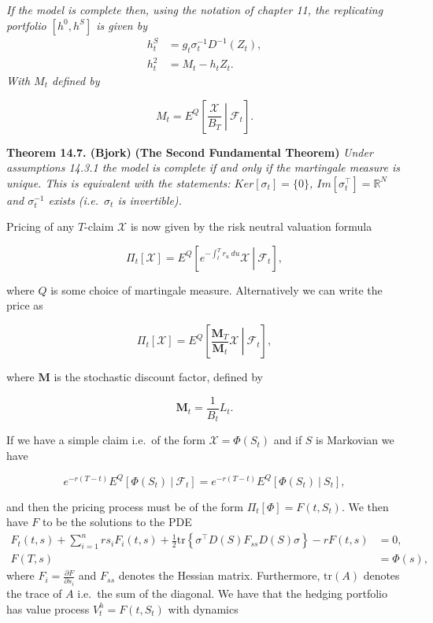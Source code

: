 \documentclass[a4paper,12pt,openany]{book}
\begin{document}
\emph{If the model is complete then, using the notation of chapter 11, the replicating portfolio \([h^0,h^S]\) is given by}
\begin{align*}
h_t^S&=g_t\sigma_t^{-1}D^{-1}(Z_t),\tag{14.24}\\
h_t^2&=M_t-h_tZ_t.\tag{14.25}
\end{align*}
\emph{With \(M_t\) defined by}

\[
M_t=E^Q\left[\left. \frac{\mathcal{X}}{B_T}\ \right\vert\ \mathcal{F}_t \right].\tag{14.17}
\]

\textbf{Theorem 14.7. (Bjork)} \textbf{(The Second Fundamental Theorem)} \emph{Under assumptions 14.3.1 the model is complete if and only if the martingale measure is unique. This is equivalent with the statements: \(Ker[\sigma_t]=\{0\}\), \(Im[\sigma_t^\top]=\mathbb{R}^N\) and \(\sigma_t^{-1}\) exists (i.e.~\(\sigma_t\) is invertible).}

Pricing of any \(T\)-claim \(\mathcal{X}\) is now given by the risk neutral valuation formula

\[
\Pi_t[\mathcal{X}] = E^Q\left[\left. e^{-\int_t^Tr_u\ du}\mathcal{X} \ \right\vert\ \mathcal{F}_t\right],\tag{14.27}
\]

where \(Q\) is some choice of martingale measure. Alternatively we can write the price as

\[
\Pi_t[\mathcal{X}] = E^Q\left[\left. \frac{\mathbf{M}_T}{\mathbf{M}_t}\mathcal{X} \ \right\vert\ \mathcal{F}_t\right],\tag{14.29}
\]

where \(\mathbf{M}\) is the stochastic discount factor, defined by

\[
\mathbf{M}_t=\frac{1}{B_t}L_t.
\]

If we have a simple claim i.e.~of the form \(\mathcal{X}=\Phi(S_t)\) and if \(S\) is Markovian we have

\[
e^{-r(T-t)}E^Q[\Phi(S_t)\ \vert\ \mathcal{F}_t]=e^{-r(T-t)}E^Q[\Phi(S_t)\ \vert\ S_t],
\]

and then the pricing process must be of the form \(\Pi_t[\Phi]=F(t,S_t)\). We then have \(F\) to be the solutions to the PDE
\begin{align*}
F_t(t,s)+\sum_{i=1}^nrs_iF_i(t,s)+\frac{1}{2}\text{tr}\left\{\sigma^\top D(S)F_{ss}D(S)\sigma\right\}-rF(t,s)&=0,\tag{14.31}\\
F(T,s)&=\Phi(s),\tag{14.31}
\end{align*}
where \(F_i=\frac{\partial F}{\partial s_i}\) and \(F_{ss}\) denotes the Hessian matrix. Furthermore, \(\text{tr}(A)\) denotes the trace of \(A\) i.e.~the sum of the diagonal. We have that the hedging portfolio has value process \(V_t^h=F(t,S_t)\) with dynamics
\end{document}
